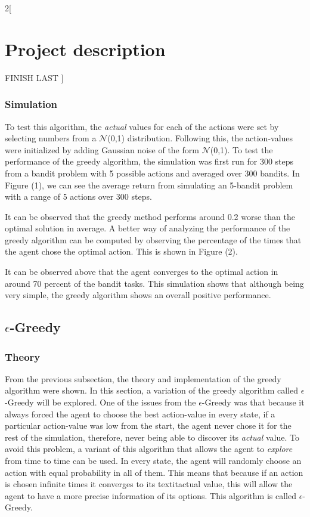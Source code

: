 \documentclass[a4paper]{article}
\begin{document}
\begin{multicols}{2}[
		\section*{Project description}
		FINISH LAST
		]
		\subsubsection{Simulation}
		To test this algorithm, the \textit{actual} values for each of the actions were set by selecting numbers from a $\mathcal{N}$(0,1) distribution. Following this, the action-values were initialized by adding Gaussian noise of the form $\mathcal{N}$(0,1). To test the performance of the greedy algorithm, the simulation was first run for 300 steps from a bandit problem with 5 possible actions and averaged over 300 bandits. In Figure (1), we can see the average return from simulating an 5-bandit problem with a range of 5 actions over 300 steps.

		It can be observed that the greedy method performs around 0.2 worse than the optimal solution in average. A better way of analyzing the performance of the greedy algorithm can be computed by observing the percentage of the times that the agent chose the optimal action. This is shown in Figure (2).

		
		It can be observed above that the agent converges to the optimal action in around 70 percent of the bandit tasks. This simulation shows that although being very simple, the greedy algorithm shows an overall positive performance.
		
		\subsection{$\epsilon$-Greedy}
		\subsubsection{Theory}
		From the previous subsection, the theory and implementation of the greedy algorithm were shown. In this section, a variation of the greedy algorithm called $\epsilon$-Greedy will be explored. One of the issues from the $\epsilon$-Greedy was that because it always forced the agent to choose the best action-value in every state, if a particular action-value was low from the start, the agent never chose it for the rest of the simulation, therefore, never being able to discover its \textit{actual} value. To avoid this problem, a variant of this algorithm that allows the agent to \textit{explore} from time to time can be used. In every state, the agent will randomly choose an action with equal probability in all of them. This means that because if an action is chosen infinite times it converges to its textit{actual} value, this will allow the agent to have a more precise information of its options. This algorithm is called $\epsilon$-Greedy.
		

\end{multicols}
\end{document}
